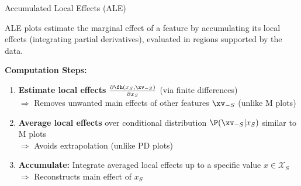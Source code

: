 \documentclass[11pt,compress,t,notes=noshow, aspectratio=169, xcolor=table]{beamer}
\begin{document}
\begin{frame}{Accumulated Local Effects (ALE) }

ALE plots estimate the marginal effect of a feature by accumulating its local effects (integrating partial derivatives), evaluated in regions supported by the data. 



\medskip
\textbf{Computation Steps:}
\begin{enumerate}[<+->]
\item \textbf{Estimate local effects} $\frac{\partial \fh(x_S, \xv_{-S})}{\partial x_S}$ (via finite differences) \label{ref1}\\ %
$\Rightarrow$ Removes unwanted main effects of other features $\xv_{-S}$ (unlike M plots)
\item \textbf{Average local effects} over conditional distribution $\P(\xv_{-S}|x_S)$ similar to M plots\\ %
$\Rightarrow$ Avoids extrapolation (unlike PD plots)\label{ref2}
\item \textbf{Accumulate:} Integrate averaged local effects up to a specific value $x \in \mathcal{X}_S$\\ %
$\Rightarrow$ Reconstructs main effect of $x_S$ \label{ref3}\\
\end{enumerate}

\end{frame}
\end{document}

